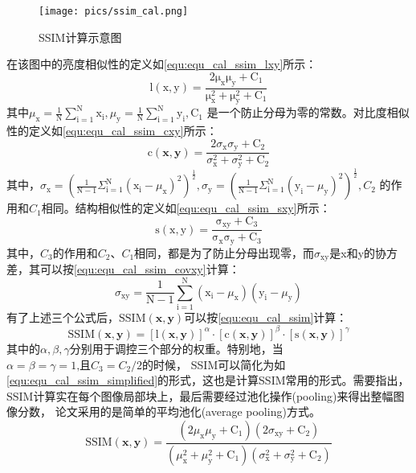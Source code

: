 \begin{figure}[htbp]
    \centering
    \texttt{[image: pics/ssim\_cal.png]}
    \caption{\label{fig:img_ssim_cal}SSIM计算示意图}
\end{figure}
在该图中的亮度相似性的定义如\autoref{equ:equ_cal_ssim_lxy}所示：
\begin{equation}
    \label{equ:equ_cal_ssim_lxy}
    \mathrm{l(x,y)=\frac{2\mu_x\mu_y+C_1}{\mu_x^2+\mu_y^2+C_1}}
\end{equation}
其中\(\mu_\mathrm{x}=\frac{1}{\mathrm{N}}\sum_{\mathrm{i}=1}^\mathrm{N} \mathrm{x_i}, \mu_\mathrm{y}=\frac{1}{\mathrm{N}}\sum_{\mathrm{i}=1}^\mathrm{N} \mathrm{y_i}, \mathrm{C_1}\)
是一个防止分母为零的常数。对比度相似性的定义如\autoref{equ:equ_cal_ssim_cxy}所示：
\begin{equation}
    \label{equ:equ_cal_ssim_cxy}
    \mathrm{c}(\mathbf{x},\mathbf{y})=\frac{2\sigma_\mathrm{x}\sigma_\mathrm{y}+\mathrm{C}_2}{\sigma_\mathrm{x}^2+\sigma_\mathrm{y}^2+\mathrm{C}_2}
\end{equation}
其中，\(\sigma_{\mathrm{x}}=\left(\frac1{\mathrm{N}-1}\Sigma_{\mathrm{i}=1}^{\mathrm{N}}\left(\mathrm{x}_{\mathrm{i}}-\mu_{\mathrm{x}}\right)^{2}\right)^{\frac12},\sigma_{\mathrm{y}}=\left(\frac1{\mathrm{N}-1}\Sigma_{\mathrm{i}=1}^{\mathrm{N}}\left(\mathrm{y}_{\mathrm{i}}-\mu_{\mathrm{y}}\right)^{2}\right)^{\frac12},C_{2}\)
的作用和\(C_1\)相同。结构相似性的定义如\autoref{equ:equ_cal_ssim_sxy}所示：
\begin{equation}
    \label{equ:equ_cal_ssim_sxy}
    \mathrm{s(x,y)=\frac{\sigma_{xy}+C_3}{\sigma_x\sigma_y+C_3}}
\end{equation}
其中，\(C_3\)的作用和\(C_2、C_1\)相同，都是为了防止分母出现零，而\(\sigma_{\mathrm{xy}}\)是x和y的协方差，其可以按\autoref{equ:equ_cal_ssim_covxy}计算：
\begin{equation}
    \label{equ:equ_cal_ssim_covxy}
    \sigma_{\mathrm{xy}}=\frac1{\mathrm{N}-1}\sum_{\mathrm{i}=1}^{\mathrm{N}}(\mathrm{x_i}-\mu_\mathrm{x})(\mathrm{y_i}-\mu_\mathrm{y})
\end{equation}
有了上述三个公式后，\(\mathrm{SSIM}(\mathbf{x},\mathbf{y})\)可以按\autoref{equ:equ_cal_ssim}计算：
\begin{equation}
    \label{equ:equ_cal_ssim}
    \mathrm{SSIM}(\mathbf{x},\mathbf{y})=[\mathrm{l}(\mathbf{x},\mathbf{y})]^\alpha\cdot[\mathrm{c}(\mathbf{x},\mathbf{y})]^\beta\cdot[\mathrm{s}(\mathbf{x},\mathbf{y})]^\gamma 
\end{equation}
其中的\(\alpha,\beta,\gamma \)分别用于调控三个部分的权重。特别地，当\(\alpha{=}\beta{=}\gamma{=}1\text{,且}C_3=C_2/2\)的时候，
SSIM可以简化为如\autoref{equ:equ_cal_ssim_simplified}的形式，这也是计算SSIM常用的形式。需要指出，SSIM计算实在每个图像局部块上，最后需要经过池化操作(pooling)来得出整幅图像分数，
论文采用的是简单的平均池化(average pooling)方式。
\begin{equation}
    \label{equ:equ_cal_ssim_simplified}
    \mathrm{SSIM}(\mathbf{x},\mathbf{y})=\frac{(2\mu_\mathrm{x}\mu_\mathrm{y}+\mathrm{C}_1)(2\sigma_\mathrm{xy}+\mathrm{C}_2)}{(\mu_\mathrm{x}^2+\mu_\mathrm{y}^2+\mathrm{C}_1)(\sigma_\mathrm{x}^2+\sigma_\mathrm{y}^2+\mathrm{C}_2)}
\end{equation}

